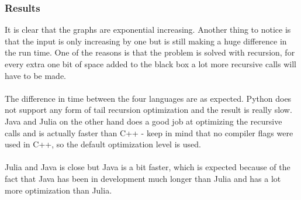 \documentclass[a4paper, 11pt, titlepage]{article}
\begin{document}
\subsubsection{Results}
It is clear that the graphs are exponential increasing. Another thing to notice is that the input is only increasing by one but is still making a huge difference in the run time. One of the reasons is that the problem is solved with recursion, for every extra one bit of space added to the black box a lot more recursive calls will have to be made.\\
\\
The difference in time between the four languages are as expected. Python does not support any form of tail recursion optimization and the result is really slow. Java and Julia on the other hand does a good job at optimizing the recursive calls and is actually faster than C++ - keep in mind that no compiler flags were used in C++, so the default optimization level is used.\\
\\
Julia and Java is close but Java is a bit faster, which is expected because of the fact that Java has been in development much longer than Julia and has a lot more optimization than Julia.
\end{document}
